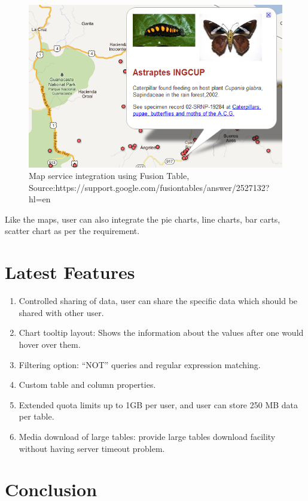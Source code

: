\documentclass[9pt,twocolumn,twoside]{styles/osajnl}
\begin{document}
\begin{figure}[htbp]
	\centering
	\includegraphics[width=\linewidth]{images/ft_mapresult}
	\caption{Map service integration using Fusion Table,  Source:https://support.google.com/fusiontables/answer/2527132?hl=en}
	\label{fig:false-color}
\end{figure}


Like the maps, user can also integrate the pie charts, line charts, bar carts, scatter chart as per the requirement. 


\section{Latest Features}

\begin{enumerate}
	\item Controlled sharing of data, user can share the specific data which should be shared with other user.
	\item Chart tooltip layout: Shows the information about the values after one would hover over them.
	\item Filtering option: “NOT” queries and regular expression matching. 
	\item Custom table and column properties.
	\item Extended quota limits up to 1GB per user, and user can store 250 MB data per table.
	\item Media download of large tables: provide large tables download facility without having server timeout problem.

\end{enumerate}


\section{Conclusion}
\end{document}
